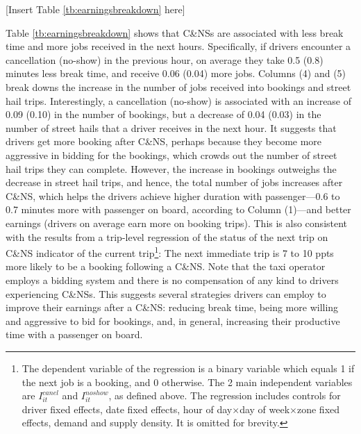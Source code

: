 \documentclass[reviewmode]{AEA}
\begin{document}
\begin{center}
	[Insert Table \ref{tb:earningsbreakdown} here]
\end{center}

Table \ref{tb:earningsbreakdown} shows that C\&NSs are associated with less break time and more jobs received in the next hours. Specifically, if drivers encounter a cancellation (no-show) in the previous hour, on average they take 0.5 (0.8) minutes less break time, and receive 0.06 (0.04) more jobs. Columns (4) and (5) break downs the increase in the number of jobs received into bookings and street hail trips. Interestingly, a cancellation (no-show) is associated with an increase of 0.09 (0.10) in the number of bookings, but a decrease of 0.04 (0.03) in the number of street hails that a driver receives in the next hour. It suggests that drivers get more booking after C\&NS, perhaps because they become more aggressive in bidding for the bookings, which crowds out the number of street hail trips they can complete. However, the increase in bookings outweighs the decrease in street hail trips, and hence, the total number of jobs increases after C\&NS, which helps the drivers achieve higher duration with passenger---0.6 to 0.7 minutes more with passenger on board, according to Column (1)---and better earnings (drivers on average earn more on booking trips). This is also consistent with the results from a trip-level regression of the status of the next trip on C\&NS indicator of the current trip\footnote{The dependent variable of the regression is a binary variable which equals 1 if the next job is a booking, and 0 otherwise. The 2 main independent variables are $I_{it}^{canel}$ and $I_{it}^{noshow}$, as defined above. The regression includes controls for driver fixed effects, date fixed effects, hour of day\(\times\)day of week\(\times\)zone fixed effects, demand and supply density. It is omitted for brevity.}: The next immediate trip is 7 to 10 ppts more likely to be a booking following a C\&NS. Note that the taxi operator employs a bidding system and there is no compensation of any kind to drivers experiencing C\&NSs. 
This suggests several strategies drivers can employ to improve their earnings after a C\&NS: reducing break time, being more willing and aggressive to bid for bookings, and, in general, increasing their productive time with a passenger on board.
\end{document}
